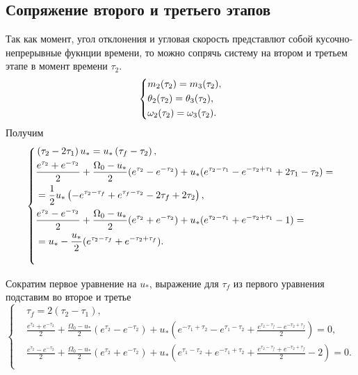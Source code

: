 \documentclass[a4paper,12pt, openany]{book}
\theoremstyle{plain} %
\theoremstyle{definition} %
\theoremstyle{remark} %
\numberwithin{equation}{chapter}
\begin{document}
{\subsection*{Сопряжение второго и третьего этапов}

Так как момент, угол отклонения и угловая скорость представлют собой кусочно-непрерывные фукнции времени,
то можно сопрячь систему на втором и третьем этапе в момент времени $\tau_2$.
\[
    \left\{ {\begin{aligned}
                 & m_2(\tau_2) = m_3(\tau_2), \hfill            \\
                 & \theta_2(\tau_2) =  \theta_3(\tau_2), \hfill \\
                 & \omega_2(\tau_2) = \omega_3(\tau_2) . \hfill \\
            \end{aligned}} \right.
\]
Получим
\[
    \left\{
    \begin{multlined}
        \left(\tau _2-2 \tau _1\right) u_*=u_* \left(\tau _f-\tau _2\right), \\
        \shoveleft{\frac{e^{\tau_2}+e^{-\tau_2}}{2}+\frac{\Omega_0-u_\ast}{2}(e^{\tau_2}-e^{-\tau_2})+u_*(e^{\tau_2-\tau_1}-e^{-\tau_2+\tau_1}+2\tau_1-\tau_2)=} \\
        \shoveleft{=\frac{1}{2} u_* \left(-e^{\tau _2-\tau _f}+e^{\tau _f-\tau _2}-2 \tau _f+2
            \tau _2\right),} \\
        \shoveleft{\frac{e^{\tau_2}-e^{-\tau_2}}{2}+\frac{\Omega_0-u_\ast}{2}(e^{\tau_2}+e^{-\tau_2})+u_*(e^{\tau_2-\tau_1}+e^{-\tau_2+\tau_1}-1)=} \\
        \shoveleft{=u_*-\frac{u_*}{2}(e^{\tau_2-\tau_f}+e^{-\tau_2+\tau_f}).} \\
    \end{multlined}
    \right.
\]

Сократим первое уравнение на $u_*$, выражение для $\tau_f$ из первого уравнения подставим во второе и третье
\begin{equation}\label{fullconnected}
    \left\{ {\begin{aligned}
                 & \tau_f=2(\tau_2-\tau_1),                                                                                                                                                                 \\
                 & \frac{e^{\tau_2}+e^{-\tau_2}}{2}+\frac{\Omega_0-u_*}{2}(e^{\tau_2}-e^{-\tau_2})+u_*\left(e^{-\tau_1+\tau_2}-e^{\tau_1-\tau_2}+\frac{e^{\tau_2-\tau_f}-e^{-\tau_2+\tau_f}}{2}\right)=0,   \\
                 & \frac{e^{\tau_2}-e^{-\tau_2}}{2}+\frac{\Omega_0-u_*}{2}(e^{\tau_2}+e^{-\tau_2})+u_*\left(e^{\tau_1-\tau_2}+e^{-\tau_1+\tau_2}+\frac{e^{\tau_2-\tau_f}+e^{-\tau_2+\tau_f}}{2}-2\right)=0. \\
            \end{aligned}} \right.
\end{equation}

}
\end{document}
